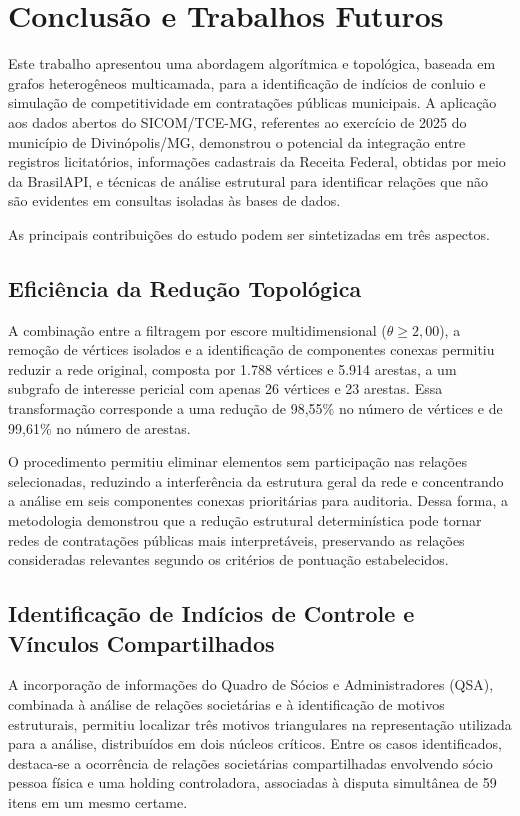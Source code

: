 \section{Conclusão e Trabalhos Futuros}
\label{sec:conclusao}


Este trabalho apresentou uma abordagem algorítmica e topológica, baseada em grafos heterogêneos multicamada, para a identificação de indícios de conluio e simulação de competitividade em contratações públicas municipais. A aplicação aos dados abertos do SICOM/TCE-MG, referentes ao exercício de 2025 do município de Divinópolis/MG, demonstrou o potencial da integração entre registros licitatórios, informações cadastrais da Receita Federal, obtidas por meio da BrasilAPI, e técnicas de análise estrutural para identificar relações que não são evidentes em consultas isoladas às bases de dados.

As principais contribuições do estudo podem ser sintetizadas em três aspectos.

\subsection{Eficiência da Redução Topológica}

A combinação entre a filtragem por escore multidimensional ($\theta \geq 2{,}00$), a remoção de vértices isolados e a identificação de componentes conexas permitiu reduzir a rede original, composta por 1.788 vértices e 5.914 arestas, a um subgrafo de interesse pericial com apenas 26 vértices e 23 arestas. Essa transformação corresponde a uma redução de 98,55\% no número de vértices e de 99,61\% no número de arestas.

O procedimento permitiu eliminar elementos sem participação nas relações selecionadas, reduzindo a interferência da estrutura geral da rede e concentrando a análise em seis componentes conexas prioritárias para auditoria. Dessa forma, a metodologia demonstrou que a redução estrutural determinística pode tornar redes de contratações públicas mais interpretáveis, preservando as relações consideradas relevantes segundo os critérios de pontuação estabelecidos.

\subsection{Identificação de Indícios de Controle e Vínculos Compartilhados}

A incorporação de informações do Quadro de Sócios e Administradores (QSA), combinada à análise de relações societárias e à identificação de motivos estruturais, permitiu localizar três motivos triangulares na representação utilizada para a análise, distribuídos em dois núcleos críticos. Entre os casos identificados, destaca-se a ocorrência de relações societárias compartilhadas envolvendo sócio pessoa física e uma holding controladora, associadas à disputa simultânea de 59 itens em um mesmo certame.

